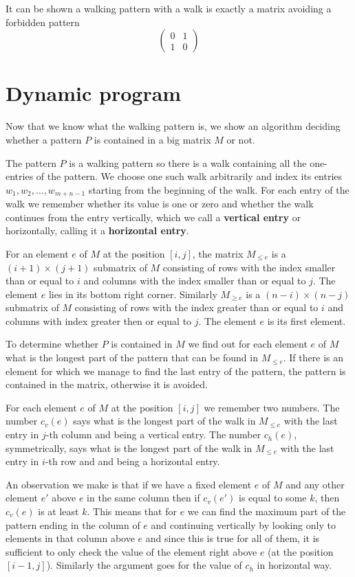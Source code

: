 It can be shown a walking pattern with a walk is exactly a matrix avoiding a forbidden pattern
$$\left(\begin{array}{cc}
0 & 1 \\
1 & 0
\end{array}\right)$$

\section{Dynamic program}
Now that we know what the walking pattern is, we show an algorithm deciding whether a pattern $P$ is contained in a big matrix $M$ or not.

The pattern $P$ is a walking pattern so there is a walk containing all the one-entries of the pattern. We choose one such walk arbitrarily and index its entries $w_1,w_2,\dots,w_{m+n-1}$ starting from the beginning of the walk. For each entry of the walk we remember whether its value is one or zero and whether the walk continues from the entry vertically, which we call a \textbf{vertical entry} or horizontally, calling it a \textbf{horizontal entry}.

For an element $e$ of $M$ at the position $[i,j]$, the matrix $M_{\leq e}$ is a $(i+1)\times(j+1)$ submatrix of $M$ consisting of rows with the index smaller than or equal to $i$ and columns with the index smaller than or equal to $j$. The element $e$ lies in its bottom right corner. Similarly $M_{\geq e}$ is a $(n-i)\times(n-j)$ submatrix of $M$ consisting of rows with the index greater than or equal to $i$ and columns with index greater then or equal to $j$. The element $e$ is its first element.

To determine whether $P$ is contained in $M$ we find out for each element $e$ of $M$ what is the longest part of the pattern that can be found in $M_{\leq e}$. If there is an element for which we manage to find the last entry of the pattern, the pattern is contained in the matrix, otherwise it is avoided.

For each element $e$ of $M$ at the position $[i,j]$ we remember two numbers. The number $c_v(e)$ says what is the longest part of the walk in $M_{\leq e}$ with the last entry in $j$-th column and being a vertical entry. The number $c_h(e)$, symmetrically, says what is the longest part of the walk in $M_{\leq e}$ with the last entry in $i$-th row and and being a horizontal entry.

An observation we make is that if we have a fixed element $e$ of $M$ and any other element $e'$ above $e$ in the same column then if $c_v(e')$ is equal to some $k$, then $c_v(e)$ is at least $k$. This means that for $e$ we can find the maximum part of the pattern ending in the column of $e$ and continuing vertically by looking only to elements in that column above $e$ and since this is true for all of them, it is sufficient to only check the value of the element right above $e$ (at the position $[i-1,j]$). Similarly the argument goes for the value of $c_h$ in horizontal way.


